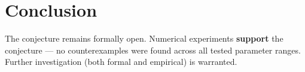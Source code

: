 \documentclass[11pt]{article}
\begin{document}
\section{Conclusion}

The conjecture remains formally open. Numerical experiments \textbf{support} the conjecture --- no counterexamples were found across all tested parameter ranges.
Further investigation (both formal and empirical) is warranted.
\end{document}
